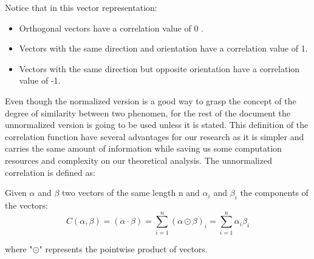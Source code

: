 Notice that in this vector
representation:
\begin{itemize}
  \item Orthogonal vectors have a correlation value of 0 .
  \item Vectors with the same direction and orientation have a correlation
  value of 1.
  \item Vectors with the same direction but opposite orientation have a
  correlation value of -1.
\end{itemize}

Even though the normalized version is a good way to grasp the
concept of the degree of similarity between two phenomen, for the rest of the
document the unnormalized version is going to be used unless it is stated.
This definition of the correlation function have several advantages for our
research as it is simpler and carries the same amount of information while
saving us some computation resources and complexity on our theoretical
analysis. The unnormalized correlation is defined as:

\begin{definition}\label{def:2}
  Given $\alpha$ and $\beta$ two vectors of the same length n and $\alpha_{i}$
  and $\beta_{i}$ the components of the vectors:
  \begin{equation}\label{eq:2}
    C(\alpha , \beta) = (\alpha \cdot  \beta) = \sum_{i=1}^n(\alpha \odot \beta)_{i}= \sum_{i=1}^{n} \alpha_{i}\beta_{i}
  \end{equation}

  where "$\odot$" represents the pointwise product of vectors.

\end{definition}


